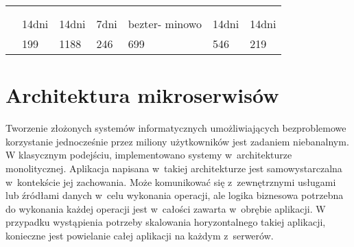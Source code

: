 \begin{minipage}{\textwidth}
\begin{table}[H]
\begin{tabular}{|P{.22\textwidth}|P{.09\textwidth}|P{.09\textwidth}|P{.09\textwidth}|P{.09\textwidth}|P{.09\textwidth}|P{.09\textwidth}|}
                                      &        &            &            &              &          &          \\ \hline
                                       &        &            &              &              &          &        \\ \hline
                   &        &            &            &              &          &        \\ \hline
                                                & 14dni                 & 14dni                     & 7dni                      & bezter- minowo            & 14dni                 & 14dni                 \\ \hline
                                           & 199                   & 1188                      & 246                       & 699                       & 546                   & 219                   \\ \hline
        \end{tabular}
    \end{table}
\end{minipage}

\section{Architektura mikroserwisów}\label{sec:usefull-technologies}

Tworzenie złożonych systemów informatycznych umożliwiających bezproblemowe korzystanie jednocześnie przez miliony użytkowników jest zadaniem niebanalnym.
W klasycznym podejściu, implementowano systemy w~architekturze monolitycznej.
Aplikacja napisana w~takiej architekturze jest samowystarczalna w~kontekście jej zachowania.
Może komunikować się z~zewnętrznymi usługami lub źródłami danych w~celu wykonania operacji,
ale logika biznesowa potrzebna do wykonania każdej operacji jest w~całości zawarta w~obrębie aplikacji.
W przypadku wystąpienia potrzeby skalowania horyzontalnego takiej aplikacji,
konieczne jest powielanie całej aplikacji na każdym z~serwerów\cite{url:microsoft-web-architectures}.

